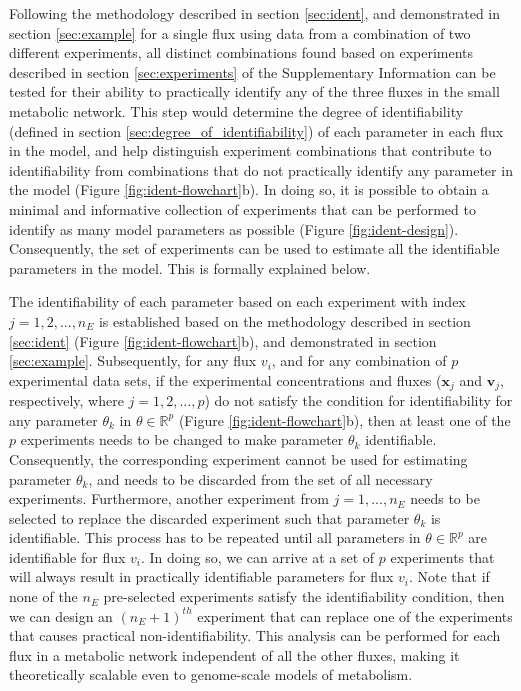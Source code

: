 \documentclass[10pt]{article}
\begin{document}
	Following the methodology described in section \ref{sec:ident}, and demonstrated in section \ref{sec:example} for a single flux using data from a combination of two different experiments, all distinct combinations found based on experiments described in section \ref{sec:experiments} of the Supplementary Information can be tested for their ability to practically identify any of the three fluxes in the small metabolic network. This step would determine the degree of identifiability (defined in section \ref{sec:degree_of_identifiability}) of each parameter in each flux in the model, and help distinguish experiment combinations that contribute to identifiability from combinations that do not practically identify any parameter in the model (Figure \ref{fig:ident-flowchart}b). In doing so, it is possible to obtain a minimal and informative collection of experiments that can be performed to identify as many model parameters as possible (Figure \ref{fig:ident-design}). Consequently, the set of experiments can be used to estimate all the identifiable parameters in the model. This is formally explained below.
	
	The identifiability of each parameter based on each experiment with index $j = {1, 2, ..., n_E}$ is established based on the methodology described in section \ref{sec:ident} (Figure \ref{fig:ident-flowchart}b), and demonstrated in section \ref{sec:example}. Subsequently, for any flux $v_i$, and for any combination of $p$ experimental data sets, if the experimental concentrations and fluxes ($\mathbf{x}_j$ and $\mathbf{v}_j$, respectively, where $j = {1, 2,..., p}$) do not satisfy the condition for identifiability for any parameter $\theta_k$ in $\theta\in\mathbb{R}^p$ (Figure \ref{fig:ident-flowchart}b), then at least one of the $p$ experiments needs to be changed to make parameter $\theta_k$ identifiable. Consequently, the corresponding experiment cannot be used for estimating parameter $\theta_k$, and needs to be discarded from the set of all necessary experiments. Furthermore, another experiment from $j = {1, ..., n_E}$ needs to be selected to replace the discarded experiment such that parameter $\theta_k$ is identifiable. This process has to be repeated until all parameters in $\theta\in\mathbb{R}^p$ are identifiable for flux $v_i$. In doing so, we can arrive at a set of $p$ experiments that will always result in practically identifiable parameters for flux $v_i$. Note that if none of the $n_E$ pre-selected experiments satisfy the identifiability condition, then we can design an $(n_E+1)^{th}$ experiment that can replace one of the experiments that causes practical non-identifiability. This analysis can be performed for each flux in a metabolic network independent of all the other fluxes, making it theoretically scalable even to genome-scale models of metabolism. 	
	
\end{document}
